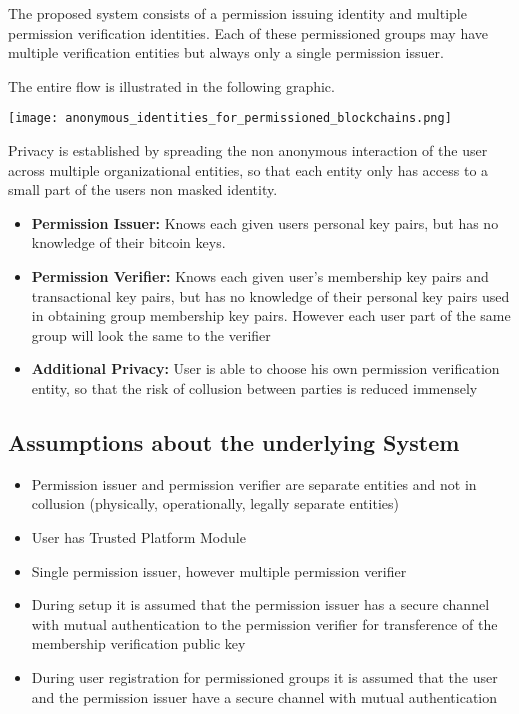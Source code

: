 The proposed system consists of a permission issuing identity and multiple permission verification identities. Each of these permissioned groups may have multiple verification entities but always only a single permission issuer.\cite[p.5]{hardjono2016anonymous}

The entire flow is illustrated in the following graphic.

 \texttt{[image: anonymous\_identities\_for\_permissioned\_blockchains.png]}

Privacy is established by spreading the non anonymous interaction of the user across multiple organizational entities, so that each entity only has access to a small part of the users non masked identity.\cite[p.4-5]{hardjono2016anonymous}
\begin{itemize}
\item \textbf{Permission Issuer:}
Knows each given users personal key pairs, but has no knowledge of their bitcoin keys.
\item \textbf{Permission Verifier:}
Knows each given user's membership key pairs and transactional key pairs, but has no knowledge of their personal key pairs used in obtaining group membership key pairs. However each user part of the same group will look the same to the verifier
\item \textbf{Additional Privacy:}
User is able to choose his own permission verification entity, so that the risk of collusion between parties is reduced immensely
\end{itemize}

\subsection{Assumptions about the underlying System}
\begin{itemize}
\item Permission issuer and permission verifier are separate entities and not in collusion (physically, operationally, legally separate entities)\cite[p.4]{hardjono2016anonymous}
\item User has Trusted Platform Module\cite[p.2-3]{hardjono2016anonymous}
\item Single permission issuer, however multiple permission verifier\cite[p.5]{hardjono2016anonymous}
\item During setup it is assumed that the permission issuer has a secure channel with mutual authentication to the permission verifier for transference of the membership verification public key\cite[p.5]{hardjono2016anonymous}
\item During user registration for permissioned groups it is assumed that the user and the permission issuer have a secure channel with mutual authentication\cite[p.6]{hardjono2016anonymous}
\end{itemize}

